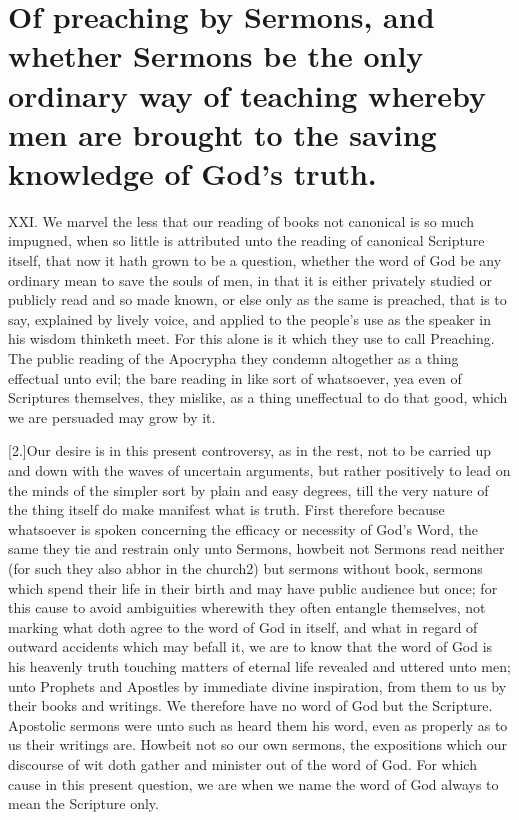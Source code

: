 \section*{Of preaching by Sermons, and whether Sermons be the only ordinary way of teaching whereby men are brought to the saving knowledge of God’s truth.}
XXI. We marvel the less that our reading of books not canonical is so much impugned, when so little is attributed unto the reading of canonical Scripture itself, that now it hath grown to be a question, whether the word of God be any ordinary mean to save the souls of men,
 in that it is either privately studied or publicly read and so made known, or else only as the same is preached, that is to say, explained by lively voice, and applied to the people’s use as the speaker in his wisdom thinketh meet. For this alone is it which they use to call Preaching. The public reading of the Apocrypha they condemn altogether as a thing effectual unto evil; the bare reading in like sort of whatsoever, yea even of Scriptures themselves, they mislike, as a thing uneffectual to do that good, which we are persuaded may grow by it.

[2.]Our desire is in this present controversy, as in the rest, not to be carried up and down with the waves of uncertain arguments, but rather positively to lead on the minds of the simpler sort by plain and easy degrees, till the very nature of the thing itself do make manifest what is truth. First therefore because whatsoever is spoken concerning the efficacy or necessity of God’s Word, the same they tie and restrain only unto Sermons, howbeit not Sermons read neither (for such they also abhor in the church2) but sermons without book, sermons which spend their life in their birth and may have public audience but once; for this cause to avoid ambiguities wherewith they often entangle themselves, not marking what doth agree to the word of God in itself, and what in regard of  outward accidents which may befall it,
 we are to know that the word of God is his heavenly truth touching matters of eternal life revealed and uttered unto men; unto Prophets and Apostles by immediate divine inspiration, from them to us by their books and writings. We therefore have no word of God but the Scripture. Apostolic sermons were unto such as heard them his word, even as properly as to us their writings are. Howbeit not so our own sermons, the expositions which our discourse of wit doth gather and minister out of the word of God. For which cause in this present question, we are when we name the word of God always to mean the Scripture only.

